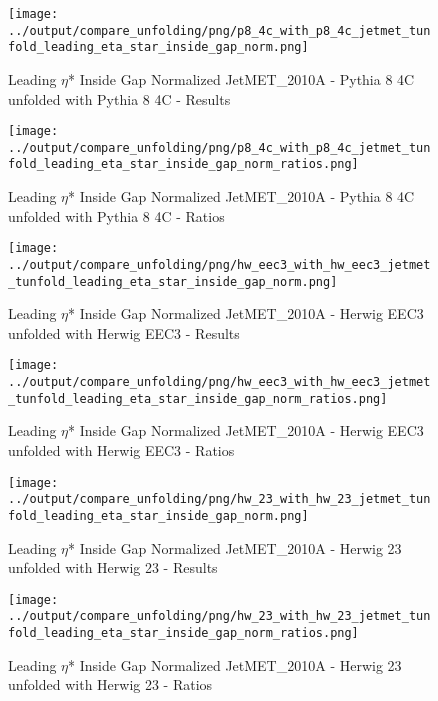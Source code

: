 \documentclass[11pt]{book}
\begin{document}
\begin{figure}[ht]
\centering
\texttt{[image: ../output/compare\_unfolding/png/p8\_4c\_with\_p8\_4c\_jetmet\_tunfold\_leading\_eta\_star\_inside\_gap\_norm.png]}
\caption{Leading $\eta$* Inside Gap Normalized JetMET\_2010A - Pythia 8 4C unfolded with Pythia 8 4C - Results}
\label{p8_p8_jetmet_tunfold_leading_eta_star_inside_gap_norm_a}
\end{figure}

\begin{figure}[ht]
\centering
\texttt{[image: ../output/compare\_unfolding/png/p8\_4c\_with\_p8\_4c\_jetmet\_tunfold\_leading\_eta\_star\_inside\_gap\_norm\_ratios.png]}
\caption{Leading $\eta$* Inside Gap Normalized JetMET\_2010A - Pythia 8 4C unfolded with Pythia 8 4C - Ratios}
\label{p8_p8_jetmet_tunfold_leading_eta_star_inside_gap_norm_b}
\end{figure}

\begin{figure}[ht]
\centering
\texttt{[image: ../output/compare\_unfolding/png/hw\_eec3\_with\_hw\_eec3\_jetmet\_tunfold\_leading\_eta\_star\_inside\_gap\_norm.png]}
\caption{Leading $\eta$* Inside Gap Normalized JetMET\_2010A - Herwig EEC3 unfolded with Herwig EEC3 - Results}
\label{hw_eec3_hw_eec3_jetmet_tunfold_leading_eta_star_inside_gap_norm_a}
\end{figure}

\begin{figure}[ht]
\centering
\texttt{[image: ../output/compare\_unfolding/png/hw\_eec3\_with\_hw\_eec3\_jetmet\_tunfold\_leading\_eta\_star\_inside\_gap\_norm\_ratios.png]}
\caption{Leading $\eta$* Inside Gap Normalized JetMET\_2010A - Herwig EEC3 unfolded with Herwig EEC3 - Ratios}
\label{hw_eec3_hw_eec3_jetmet_tunfold_leading_eta_star_inside_gap_norm_b}
\end{figure}

\begin{figure}[ht]
\centering
\texttt{[image: ../output/compare\_unfolding/png/hw\_23\_with\_hw\_23\_jetmet\_tunfold\_leading\_eta\_star\_inside\_gap\_norm.png]}
\caption{Leading $\eta$* Inside Gap Normalized JetMET\_2010A - Herwig 23 unfolded with Herwig 23 - Results}
\label{hw_23_hw_23_jetmet_tunfold_leading_eta_star_inside_gap_norm_a}
\end{figure}

\begin{figure}[ht]
\centering
\texttt{[image: ../output/compare\_unfolding/png/hw\_23\_with\_hw\_23\_jetmet\_tunfold\_leading\_eta\_star\_inside\_gap\_norm\_ratios.png]}
\caption{Leading $\eta$* Inside Gap Normalized JetMET\_2010A - Herwig 23 unfolded with Herwig 23 - Ratios}
\label{hw_23_hw_23_jetmet_tunfold_leading_eta_star_inside_gap_norm_b}
\end{figure}
\end{document}
